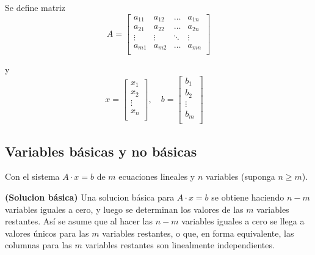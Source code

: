 \documentclass[../main.tex]{subfiles}
\begin{document}
        Se define matriz
        \begin{equation}
            A = \begin{bmatrix}
                a_{11} & a_{12} & \dots & a_{1n} \\
                a_{21} & a_{22} & \dots & a_{2n} \\
                \vdots & \vdots & \ddots & \vdots \\
                a_{m1} & a_{m2} & \dots & a_{mn} \\
            \end{bmatrix}
        \end{equation}

        y
        \begin{equation}
            x = \begin{bmatrix}
                x_1 \\
                x_2 \\
                \vdots \\
                x_n \\
            \end{bmatrix}, \quad 
            b = \begin{bmatrix}
                b_1 \\
                b_2 \\
                \vdots \\
                b_m \\
            \end{bmatrix} \quad
        \end{equation}


    \subsection{Variables básicas y no básicas}
        Con el sistema $A \cdot x = b$ de $m$ ecuaciones lineales y $n$ variables (suponga $n \geq m$).

        \begin{definition} \textbf{(Solucion básica)}
            Una solucion básica para $A \cdot x = b$ se obtiene haciendo $n-m$ variables iguales a cero, y luego se determinan los valores de las $m$ variables restantes. Así se asume que al hacer las $n-m$ variables iguales a cero se llega a valores únicos para las $m$ variables restantes, o que, en forma equivalente, las columnas para las $m$ variables restantes son linealmente independientes.
        \end{definition}
\end{document}
